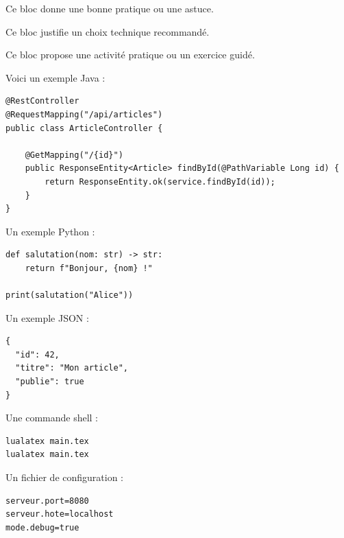 \begin{conseil}
Ce bloc donne une bonne pratique ou une astuce.
\end{conseil}

\begin{choix}
Ce bloc justifie un choix technique recommandé.
\end{choix}

\begin{atelier}
Ce bloc propose une activité pratique ou un exercice guidé.
\end{atelier}


Voici un exemple Java :

\begin{lstlisting}[style=java,caption={Exemple de contrôleur Java}]
@RestController
@RequestMapping("/api/articles")
public class ArticleController {

    @GetMapping("/{id}")
    public ResponseEntity<Article> findById(@PathVariable Long id) {
        return ResponseEntity.ok(service.findById(id));
    }
}
\end{lstlisting}

Un exemple Python :

\begin{lstlisting}[style=python,caption={Exemple Python}]
def salutation(nom: str) -> str:
    return f"Bonjour, {nom} !"

print(salutation("Alice"))
\end{lstlisting}

Un exemple JSON :

\begin{lstlisting}[style=json,caption={Exemple de réponse JSON}]
{
  "id": 42,
  "titre": "Mon article",
  "publie": true
}
\end{lstlisting}

Une commande shell :

\begin{lstlisting}[style=bash,caption={Commandes de compilation}]
lualatex main.tex
lualatex main.tex
\end{lstlisting}

Un fichier de configuration :

\begin{lstlisting}[style=properties,caption={Fichier de configuration}]
serveur.port=8080
serveur.hote=localhost
mode.debug=true
\end{lstlisting}



